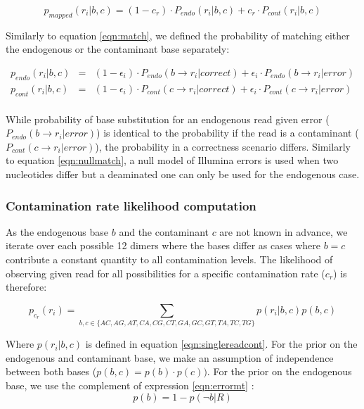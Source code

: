 \documentclass[a4paper,12pt]{article}
\begin{document}
\begin{equation}
p_{mapped}(r_i|b,c) = (1-c_r) \cdot P_{endo} (r_i|b,c)   + c_r \cdot P_{cont} (r_i|b,c)
\end{equation}

\noindent Similarly to equation \ref{eqn:match}, we defined the probability of matching either the endogenous or the contaminant base separately:


\begin{eqnarray}
  p_{endo}(r_i|b,c)   & = &  (1-\epsilon_i ) \cdot  P_{endo}( b \to r_i|correct) +  \epsilon_i \cdot P_{endo}(  b \to r_i |error)   \\
  p_{cont}(r_i|b,c)   & = &  (1-\epsilon_i ) \cdot  P_{cont}( c \to r_i|correct) +  \epsilon_i \cdot P_{cont}(  c \to r_i |error)   \\
\end{eqnarray} 

\noindent While probability of base substitution for an endogenous read given error ($P_{endo}(  b \to r_i |error)$) is identical to the probability if the read is a contaminant ($P_{cont}(  c \to r_i |error)$), the probability in a correctness scenario differs. Similarly to equation \ref{eqn:nullmatch}, a null model of Illumina errors is used when two nucleotides differ but a deaminated one can only be used for the endogenous case. 

\subsubsection{Contamination rate likelihood computation}

As the endogenous base $b$ and the contaminant $c$ are not known in advance, we iterate over each possible 12 dimers where the bases differ as cases where $b=c$ contribute a constant quantity to all contamination levels. The likelihood of observing given read for all possibilities for a specific contamination rate ($c_r$) is therefore:

\begin{equation}
p_{c_r}(r_i) = \sum\limits_{ b,c \in \{AC,AG,AT,CA,CG,CT,GA,GC,GT,TA,TC,TG\} } p(r_i|b,c) p(b,c)
\end{equation}

\noindent Where $p(r_i|b,c)$ is defined in equation \ref{eqn:singlereadcont}. For the prior on the endogenous and contaminant base, we make an assumption of independence between both bases ($p(b,c) = p(b) \cdot p(c))$. For the prior on the endogenous base, we use the complement of expression \ref{eqn:errormt} :
\begin{equation}
p(b)  = 1 - p(\neg b|R)
\end{equation}
\end{document}
